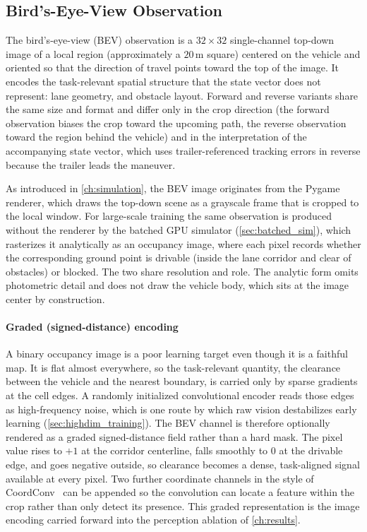 \subsection{Bird's-Eye-View Observation}

The bird's-eye-view (BEV) observation is a $32 \times 32$ single-channel top-down image of a local region (approximately a $20$\,m square) centered on the vehicle and oriented so that the direction of travel points toward the top of the image. It encodes the task-relevant spatial structure that the state vector does not represent: lane geometry, and obstacle layout. Forward and reverse variants share the same size and format and differ only in the crop direction (the forward observation biases the crop toward the upcoming path, the reverse observation toward the region behind the vehicle) and in the interpretation of the accompanying state vector, which uses trailer-referenced tracking errors in reverse because the trailer leads the maneuver.

As introduced in \cref{ch:simulation}, the BEV image originates from the Pygame renderer, which draws the top-down scene as a grayscale frame that is cropped to the local window. For large-scale training the same observation is produced without the renderer by the batched GPU simulator (\cref{sec:batched_sim}), which rasterizes it analytically as an occupancy image, where each pixel records whether the corresponding ground point is drivable (inside the lane corridor and clear of obstacles) or blocked. The two share resolution and role. The analytic form omits photometric detail and does not draw the vehicle body, which sits at the image center by construction.

\paragraph{Graded (signed-distance) encoding}
A binary occupancy image is a poor learning target even though it is a faithful map. It is flat almost everywhere, so the task-relevant quantity, the clearance between the vehicle and the nearest boundary, is carried only by sparse gradients at the cell edges. A randomly initialized convolutional encoder reads those edges as high-frequency noise, which is one route by which raw vision destabilizes early learning (\cref{sec:highdim_training}). The BEV channel is therefore optionally rendered as a graded signed-distance field rather than a hard mask. The pixel value rises to $+1$ at the corridor centerline, falls smoothly to $0$ at the drivable edge, and goes negative outside, so clearance becomes a dense, task-aligned signal available at every pixel. Two further coordinate channels in the style of CoordConv~\cite{liu2018coordconv} can be appended so the convolution can locate a feature within the crop rather than only detect its presence. This graded representation is the image encoding carried forward into the perception ablation of \cref{ch:results}.

